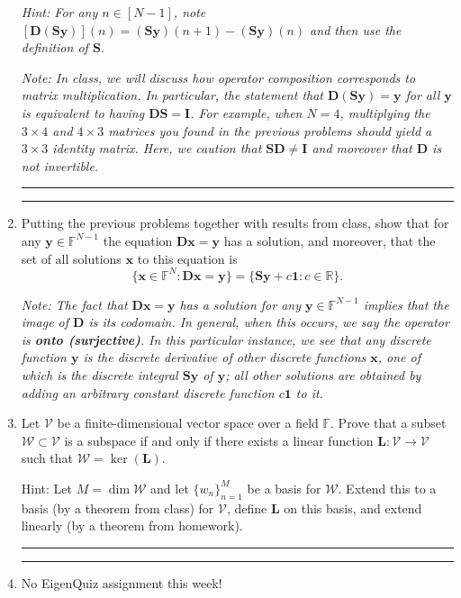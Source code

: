 \documentclass[12pt]{amsart}
\newcommand{\1}{\mathbbm{1}}
\numberwithin{equation}{section}
\numberwithin{Theorem}{section}
\theoremstyle{plain} %
\theoremstyle{definition}
\theoremstyle{remark}
\begin{document}
\begin{enumerate}[1.]
\textit{Hint: For any $n\in[N-1]$,
note $[\mathbf{D}(\mathbf{S}\mathbf{y})](n)=(\mathbf{S}\mathbf{y})(n+1)-(\mathbf{S}\mathbf{y})(n)$ and then use the definition of $\mathbf{S}$.}

\textit{Note: In class, we will discuss how operator composition corresponds to matrix multiplication.
In particular, the statement that $\mathbf{D}(\mathbf{S}\mathbf{y})=\mathbf{y}$ for all $\mathbf{y}$ is equivalent to having $\mathbf{D}\mathbf{S}=\mathbf{I}$.
For example, when $N=4$, multiplying the $3\times 4$ and $4\times 3$ matrices you found in the previous problems should yield a $3\times 3$ identity matrix.
Here, we caution that $\mathbf{S}\mathbf{D}\neq\mathbf{I}$ and moreover that $\mathbf{D}$ is not invertible.}

\bigskip
\hrule
\bigskip

\bigskip
\hrule
\bigskip

\item
Putting the previous problems together with results from class,
show that for any $\mathbf{y}\in\mathbb{F}^{N-1}$ the equation $\mathbf{D}\mathbf{x}=\mathbf{y}$ has a solution, and moreover, that the set of all solutions $\mathbf{x}$ to this equation is
\begin{equation*}
\{\mathbf{x}\in\mathbb{F}^N: \mathbf{D}\mathbf{x}=\mathbf{y}\}
=\{\mathbf{S}\mathbf{y}+c\mathbf{1}: c\in\mathbb{R}\}.
\end{equation*}

\textit{Note:
The fact that $\mathbf{D}\mathbf{x}=\mathbf{y}$ has a solution for any $\mathbf{y}\in\mathbb{F}^{N-1}$ implies that the image of $\mathbf{D}$ is its codomain.
In general, when this occurs, we say the operator is \textbf{onto (surjective)}.
In this particular instance, we see that any discrete function $\mathbf{y}$ is the discrete derivative of other discrete functions $\mathbf{x}$,
one of which is the discrete integral $\mathbf{S}\mathbf{y}$ of $\mathbf{y}$;
all other solutions are obtained by adding an arbitrary constant discrete function $c\mathbf{1}$ to it.}


\bigskip

\item Let \(\mathcal{V}\) be a finite-dimensional vector space over a field \(\mathbb{F}\). Prove that a subset \(\mathcal{W}\subset\mathcal{V}\) is a subspace if and only if there exists a linear function \(\mathbf{L}:\mathcal{V}\to\mathcal{V}\) such that \(\mathcal{W}=\operatorname{ker}(\mathbf{L})\). 

Hint: Let \(M = \operatorname{dim}\mathcal{W}\) and let \(\{w_{n}\}_{n=1}^{M}\) be a basis for \(\mathcal{W}\). Extend this to a basis (by a theorem from class) for \(\mathcal{V}\), define \(\mathbf{L}\) on this basis, and extend linearly (by a theorem from homework).


\bigskip
\hrule
\bigskip

\bigskip
\hrule
\bigskip


\item No EigenQuiz assignment this week!

\end{enumerate}
\end{document}
